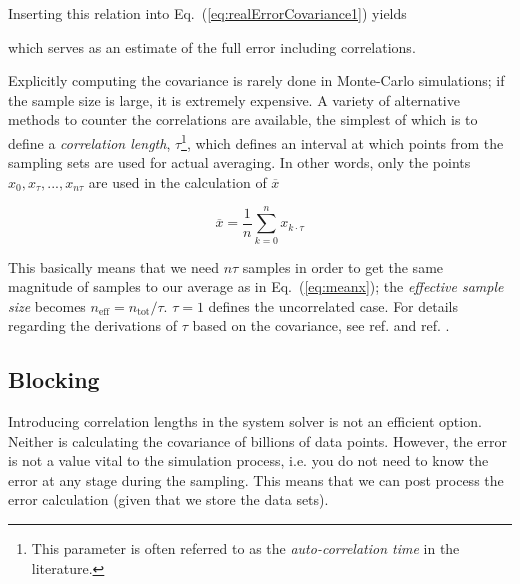 Inserting this relation into Eq.~(\ref{eq:realErrorCovariance1}) yields


which serves as an estimate of the full error including correlations. 

Explicitly computing the covariance is rarely done in Monte-Carlo simulations; if the sample size is large, it is extremely expensive. A variety of alternative methods to counter the correlations are available, the simplest of which is to define a \textit{correlation length}, $\tau$\footnote{This parameter is often referred to as the \textit{auto-correlation time} in the literature.}, which defines an interval at which points from the sampling sets are used for actual averaging. In other words, only the points $x_0, x_{\tau}, ..., x_{n\tau}$ are used in the calculation of $\overline{x}$

\begin{equation}
 \overline{x} = \frac{1}{n}\sum_{k=0}^n x_{k\cdot\tau}
\end{equation}

This basically means that we need $n\tau$ samples in order to get the same magnitude of samples to our average as in Eq.~(\ref{eq:meanx}); the \textit{effective sample size} becomes $n_\mathrm{eff} = n_\mathrm{tot}/\tau$. $\tau = 1$ defines the uncorrelated case. For details regarding the derivations of $\tau$ based on the covariance, see ref. \cite{flyvbjerg:461} and ref. \cite{morten}.

\subsection{Blocking}

Introducing correlation lengths in the system solver is not an efficient option. Neither is calculating the covariance of billions of data points. However, the error is not a value vital to the simulation process, i.e. you do not need to know the error at any stage during the sampling. This means that we can post process the error calculation (given that we store the data sets).

